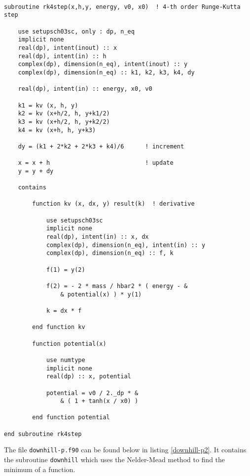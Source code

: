 \documentclass[12pt]{article}
\begin{document}
\begin{lstlisting}[frame=single,caption={{\tt rk4step.f90}},label=rk4step2]

subroutine rk4step(x,h,y, energy, v0, x0)  ! 4-th order Runge-Kutta step
	
	use setupsch03sc, only : dp, n_eq
	implicit none
	real(dp), intent(inout) :: x
	real(dp), intent(in) :: h
	complex(dp), dimension(n_eq), intent(inout) :: y 
	complex(dp), dimension(n_eq) :: k1, k2, k3, k4, dy

	real(dp), intent(in) :: energy, x0, v0
	
	k1 = kv (x, h, y)
	k2 = kv (x+h/2, h, y+k1/2)
	k3 = kv (x+h/2,	h, y+k2/2)
	k4 = kv (x+h, h, y+k3)	

	dy = (k1 + 2*k2 + 2*k3 + k4)/6		! increment
	
	x = x + h                     		! update
	y = y + dy

    contains
    
        function kv (x, dx, y) result(k)  ! derivative

	        use setupsch03sc
	        implicit none
	        real(dp), intent(in) :: x, dx
	        complex(dp), dimension(n_eq), intent(in) :: y
	        complex(dp), dimension(n_eq) :: f, k
			
			f(1) = y(2) 
			
			f(2) = - 2 * mass / hbar2 * ( energy - &
				& potential(x) ) * y(1)
		
			k = dx * f 
	
		end function kv
		
		function potential(x)

			use numtype
			implicit none 
			real(dp) :: x, potential 

			potential = v0 / 2._dp * &
				& ( 1 + tanh(x / x0) )

		end function potential
	
end subroutine rk4step

\end{lstlisting}

The file {\tt downhill-p.f90} can be found below in listing \ref{downhill-p2}.  It contains the subroutine {\tt downhill} which uses the Nelder-Mead method to find the minimum of a function.  
\end{document}
